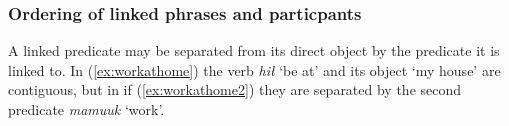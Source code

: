 \begin{comment}
ACTUALLY*2: This works quite well for showing a deictic predicate. Unfortunately it is XL so I cannot use it. Oh well!

ACTUALLY! I think the below is wrong. If you look at XL's sentence, the predicate is deictic ʔaḥʔaa, to which the linker still attaches! This would mean the only counterexample would be Adv V+link. Investigate this further.

But occasionally the linker may occur on the sole predicate in a sentence. This appears to contradict examples (\ref{ex:someonespoke}) and (\ref{ex:*someonespoke}), but the translation provided for these ``dangling" linkers always indicates they are notionally attached to the preceding sentence. I have 1 (TODO: look for more, update number) example from my corpus, involving the word \textit{qʷis} `do so'.\footnote{I am not here counting examples from \textit{tupaat} Julia Lucas, who is unique in always uses the the conjunction \textit{ʔunʔuuƛ} with a linker attached. I believe she has a different lexical entry for the word, and will explain in section (TODO).} I give one example below:

TODO, this is from Charlie Lucas, who I do not have permissions to share. Update it with a sharable example.

Context: \textit{łačiƛni wa. ʔuušciłʔap̓aƛukni nunuuk. ʔuušciłʔap̓aƛukni huyaał.} `We've let it go, haven't we? It has become hard for us to sing. It has become hard for us to dance.'

\ex \label{ex:danglinglinker}
\begingl
\glpreamble ʔaḥʔaa qʷisḥnii.//
\gla ʔaḥʔaa qʷis-(q)ḥ=niˑ //
\glb DDYN do.so-\textsc{link}=\textsc{neut.1pl} //
\glft `That's what happened to us.' //
\endgl
\xe

Although the one predicate is 

\end{comment}

\subsubsection{Ordering of linked phrases and particpants} \label{sec:link:participants}

A linked predicate may be separated from its direct object by the predicate it is linked to. In (\ref{ex:workathome}) the verb \textit{hił} `be at' and its object `my house' are contiguous, but in if (\ref{ex:workathome2}) they are separated by the second predicate \textit{mamuuk} `work'.

